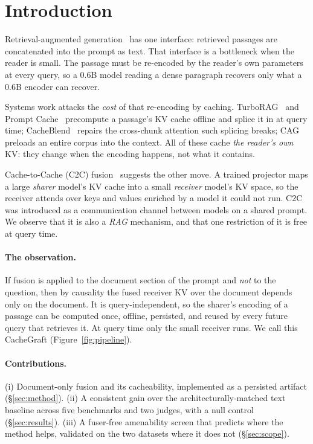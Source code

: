 \documentclass[sigconf,anonymous,review]{acmart}
\newcommand{\sys}{CacheGraft}
\begin{document}
\section{Introduction}

Retrieval-augmented generation~\cite{lewis2020rag} has one interface: retrieved passages are
concatenated into the prompt as text. That interface is a bottleneck when the reader is small.
The passage must be re-encoded by the reader's own parameters at every query, so a 0.6B model
reading a dense paragraph recovers only what a 0.6B encoder can recover.

Systems work attacks the \emph{cost} of that re-encoding by caching.
TurboRAG~\cite{lu2025turborag} and Prompt Cache~\cite{gim2024promptcache} precompute a passage's
KV cache offline and splice it in at query time; CacheBlend~\cite{yao2025cacheblend} repairs the
cross-chunk attention such splicing breaks; CAG~\cite{chan2024cag} preloads an entire corpus into
the context. All of these cache \emph{the reader's own} KV: they change when the encoding
happens, not what it contains.

Cache-to-Cache (C2C) fusion~\cite{c2c2025} suggests the other move. A trained projector maps a
large \emph{sharer} model's KV cache into a small \emph{receiver} model's KV space, so the
receiver attends over keys and values enriched by a model it could not run. C2C was introduced as
a communication channel between models on a shared prompt. We observe that it is also a
\emph{RAG} mechanism, and that one restriction of it is free at query time.

\paragraph{The observation.} If fusion is applied to the document section of the prompt and
\emph{not} to the question, then by causality the fused receiver KV over the document depends
only on the document. It is query-independent, so the sharer's encoding of a passage can be
computed once, offline, persisted, and reused by every future query that retrieves it. At query
time only the small receiver runs. We call this \sys{} (Figure~\ref{fig:pipeline}).

\paragraph{Contributions.}
(i) Document-only fusion and its cacheability, implemented as a persisted artifact
(\S\ref{sec:method}).
(ii) A consistent gain over the architecturally-matched text baseline across five benchmarks and
two judges, with a null control (\S\ref{sec:results}).
(iii) A fuser-free amenability screen that predicts where the method helps, validated on the two
datasets where it does not (\S\ref{sec:scope}).
\end{document}
